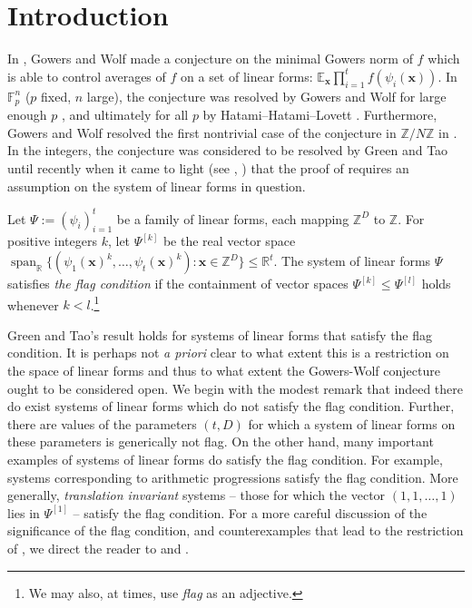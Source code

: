 \documentclass[10pt]{article}
\def\Z{\mathbb{Z}}
\def\R{\mathbb{R}}
\def\F{\mathbb{F}}
\def\E{\mathbb{E}}
\DeclareMathOperator\spa{span}
\newcommand{\vect}[1]{\boldsymbol{#1}}
\begin{document}
\section{Introduction}\label{s:intro}
In \cite[Conjecture 2.5]{GW10}, Gowers and Wolf made a conjecture on the minimal Gowers norm of $f$ which is able to control averages of $f$ on a set of linear forms: $\E_{\vect x} \prod_{i=1}^t f(\psi_i(\vect x))$. In $\F_p^n$ ($p$ fixed, $n$ large), the conjecture was resolved by Gowers and Wolf for large enough $p$ \cite{GW10, GW11quad, GW11high} , and ultimately for all $p$ by Hatami--Hatami--Lovett \cite{HHL16}. Furthermore, Gowers and Wolf resolved the first nontrivial case of the conjecture in $\Z/N\Z$ in \cite{GW11cyc}. In the integers, the conjecture was considered to be resolved by Green and Tao until recently when it came to light (see \cite{GT20}, \cite{T20}) that the proof of \cite[Theorem 1.13]{GT10} requires an assumption on the system of linear forms in question.

Let $\Psi:=(\psi_i)_{i=1}^t$ be a family of linear forms, each mapping $\Z^D$ to $\Z$. For positive integers $k$, let $\Psi^{[k]}$ be the real vector space $\spa_{\R}\{(\psi_1(\vect x)^k, \ldots, \psi_t(\vect x)^k):\vect x \in \Z^D\} \leq \R^t$. The system of linear forms $\Psi$ satisfies \textit{the flag condition} if the containment of vector spaces $\Psi^{[k]} \leq \Psi^{[l]}$ holds whenever $k < l$.\footnote{We may also, at times, use \textit{flag} as an adjective.} 

Green and Tao's result \cite[Theorem 1.13]{GT10} holds for systems of linear forms that satisfy the flag condition. It is perhaps not \textit{a priori} clear to what extent this is a restriction on the space of linear forms and thus to what extent the Gowers-Wolf conjecture ought to be considered open. We begin with the modest remark that indeed there do exist systems of linear forms which do not satisfy the flag condition. Further, there are values of the parameters $(t,D)$ for which a system of linear forms on these parameters is generically not flag. On the other hand, many important examples of systems of linear forms do satisfy the flag condition. For example, systems corresponding to arithmetic progressions satisfy the flag condition. More generally, \textit{translation invariant} systems -- those for which the vector $(1,1,\ldots, 1)$ lies in  $\Psi^{[1]}$ -- satisfy the flag condition. For a more careful discussion of the significance of the flag condition, and counterexamples that lead to the restriction of \cite[Theorem 1.13]{GT10}, we direct the reader to \cite{GT20} and \cite{T20}.
\end{document}
